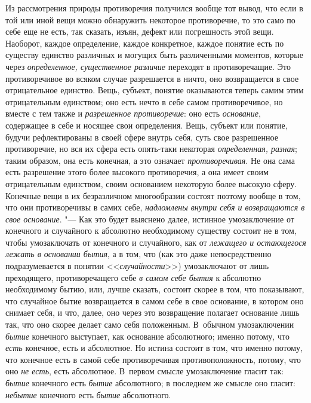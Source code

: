 Из рассмотрения природы противоречия получился вообще тот вывод, что если в
той или иной вещи можно обнаружить некоторое противоречие, то это само по
себе еще не есть, так сказать, изъян, дефект или погрешность этой вещи.
Наоборот, каждое определение, каждое конкретное, каждое понятие есть по
существу единство различных и могущих быть различенными моментов, которые
через {\em определенное, существенное различие}
переходят в противоречащие. Это противоречивое во всяком случае разрешается
в ничто, оно возвращается в свое отрицательное единство. Вещь, субъект,
понятие оказываются теперь самим этим отрицательным единством; оно есть
нечто в себе самом противоречивое, но вместе с тем также и
{\em разрешенное противоречие}: оно есть
{\em основание}, содержащее в себе и носящее свои
определения. Вещь, субъект или понятие, будучи рефлектированы в своей сфере
внутрь себя, суть свое разрешенное противоречие, но вся их сфера есть
опять-таки некоторая {\em определенная, разная}; таким
образом, она есть конечная, а это означает
{\em противоречивая}. Не она сама есть разрешение этого
более высокого противоречия, а она имеет своим отрицательным единством,
своим основанием некоторую более высокую сферу. Конечные вещи в их
безразличном многообразии состоят поэтому вообще в том, что они
противоречивы в самих себе, {\em надломлены внутри себя
и возвращаются в свое основание}. "--- Как это будет выяснено далее, истинное
умозаключение от конечного и случайного к абсолютно необходимому существу
состоит не в том, чтобы умозаключать от конечного и случайного, как от
{\em лежащего и остающегося лежать в основании бытия},
а в том, что (как это даже непосредственно подразумевается в понятии
<<{\em случайности}>>) умозаключают от лишь преходящего,
противоречащего себе {\em в самом себе бытия} к
абсолютно необходимому бытию, или, лучше сказать, состоит скорее в том, что
показывают, что случайное бытие возвращается в самом себе в свое основание,
в котором оно снимает себя, и что, далее, оно через это возвращение
полагает основание лишь так, что оно скорее делает само себя положенным.
В~обычном умозаключении {\em бытие} конечного выступает,
как основание абсолютного; именно потому, что
{\em есть} конечное, есть и абсолютное. Но истина
состоит в том, что именно потому, что конечное есть в самой себе
противоречивая противоположность, потому, что оно
{\em не есть}, есть абсолютное. В~первом смысле
умозаключение гласит так: {\em бытие} конечного есть
{\em бытие} абсолютного; в последнем же смысле оно
гласит: {\em небытие} конечного есть {\em бытие} абсолютного.
